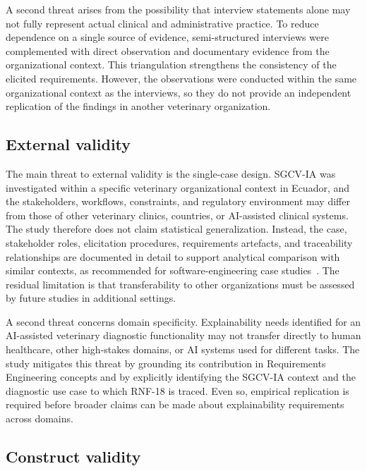 \documentclass[pdflatex,sn-mathphys-num,Numbered]{sn-jnl}
\begin{document}
A second threat arises from the possibility that interview statements alone may not fully represent actual clinical and administrative practice. To reduce dependence on a single source of evidence, semi-structured interviews were complemented with direct observation and documentary evidence from the organizational context. This triangulation strengthens the consistency of the elicited requirements. However, the observations were conducted within the same organizational context as the interviews, so they do not provide an independent replication of the findings in another veterinary organization.

\subsection{External validity}\label{tv:external}

The main threat to external validity is the single-case design. SGCV-IA was investigated within a specific veterinary organizational context in Ecuador, and the stakeholders, workflows, constraints, and regulatory environment may differ from those of other veterinary clinics, countries, or AI-assisted clinical systems. The study therefore does not claim statistical generalization. Instead, the case, stakeholder roles, elicitation procedures, requirements artefacts, and traceability relationships are documented in detail to support analytical comparison with similar contexts, as recommended for software-engineering case studies~\cite{runeson2009}. The residual limitation is that transferability to other organizations must be assessed by future studies in additional settings.

A second threat concerns domain specificity. Explainability needs identified for an AI-assisted veterinary diagnostic functionality may not transfer directly to human healthcare, other high-stakes domains, or AI systems used for different tasks. The study mitigates this threat by grounding its contribution in Requirements Engineering concepts and by explicitly identifying the SGCV-IA context and the diagnostic use case to which RNF-18 is traced. Even so, empirical replication is required before broader claims can be made about explainability requirements across domains.

\subsection{Construct validity}\label{tv:construct}
\end{document}
